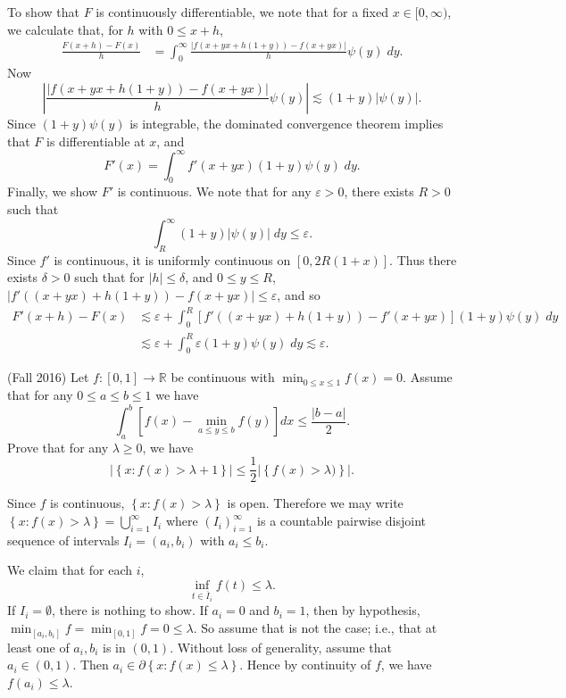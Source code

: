 \documentclass[answers]{exam}
\theoremstyle{problemstyle}
\newcommand{\1}[1]{\textbf{1}_{\left[#1\right]}} %
\def\R{\mathbb{R}} %
\begin{document}
\begin{questions}
\begin{solution}
    To show that $F$ is continuously differentiable, we note that for a fixed $x \in [0,\infty)$, we calculate that, for $h$ with $0 \leq x + h$,
    \begin{align*}
        \frac{F(x+h) - F(x)}{h} &= \int_0^\infty \frac{|f(x+yx + h(1 + y)) - f(x + yx)|}{h} \psi(y)\; dy.
    \end{align*}
    Now
    \[ \left| \frac{|f(x+yx + h(1 + y)) - f(x + yx)|}{h} \psi(y) \right| \lesssim (1 + y) |\psi(y)|. \]
    Since $(1 + y) \psi(y)$ is integrable, the dominated convergence theorem implies that $F$ is differentiable at $x$, and
    \[ F'(x) = \int_0^\infty f'(x + yx) (1 + y) \psi(y)\; dy. \]
    Finally, we show $F'$ is continuous. We note that for any $\varepsilon > 0$, there exists $R > 0$ such that
    \[ \int_R^\infty (1 + y) |\psi(y)|\; dy \leq \varepsilon. \]
    Since $f'$ is continuous, it is uniformly continuous on $[0,2R(1 + x)]$. Thus there exists $\delta > 0$ such that for $|h| \leq \delta$, and $0 \leq y \leq R$, $|f'((x + yx) + h(1 + y)) - f(x + yx)| \leq \varepsilon$, and so
    \begin{align*}
        F'(x+h) - F(x) &\lesssim \varepsilon + \int_0^R [f'((x + yx) + h(1 + y)) - f'(x + yx)] (1 + y) \psi(y)\; dy\\
        &\lesssim \varepsilon + \int_0^R \varepsilon (1 + y) \psi(y)\; dy \lesssim \varepsilon.
    \end{align*}
\end{solution}

\question (Fall 2016) Let $f:[0,1]\to \R$ be continuous with $\min_{0\leq x\leq 1} f(x) = 0$. Assume that for any $0\leq a\leq b\leq 1$ we have
%
\[ \int_{a}^{b}[f(x)-\min_{a\leq y\leq b}f(y)]dx \leq \frac{|b-a|}{2}. \]
%
Prove that for any $\lambda\geq 0$, we have
\begin{equation*}
\left| \left\{ x:f(x)>\lambda+1 \right\} \right|\leq \frac{1}{2} \left| \left\{ f(x)>\lambda) \right\} \right|.
\end{equation*}

\begin{solution}
  Since $f$ is continuous, $\left\{x: f(x)>\lambda \right\}$ is open. Therefore we may write $\left\{x: f(x)>\lambda \right\} = \bigcup_{i=1}^{\infty}I_{i}$ where $(I_{i})_{i=1}^{\infty}$ is a countable pairwise disjoint sequence of intervals $I_{i}=(a_{i},b_{i})$ with $a_{i}\leq b_{i}$.

  We claim that for each $i$,
  \[ \inf_{t \in \overline{I}_i} f(t) \leq \lambda. \]
  If $I_i = \emptyset$, there is nothing to show. If $a_i = 0$ and $b_i = 1$, then by hypothesis, $\min_{[a_{i},b_{i}]}f =\min_{[0,1]}f = 0\leq \lambda$. So assume that is not the case; i.e., that at least one of $a_{i},b_{i}$ is in $(0,1)$. Without loss of generality, assume that $a_i \in (0,1)$. Then $a_i \in \partial \left\{ x: f(x)\leq \lambda \right\}$. Hence by continuity of $f$, we have $f(a_{i})\leq \lambda$.


\end{solution}
\end{questions}
\end{document}
